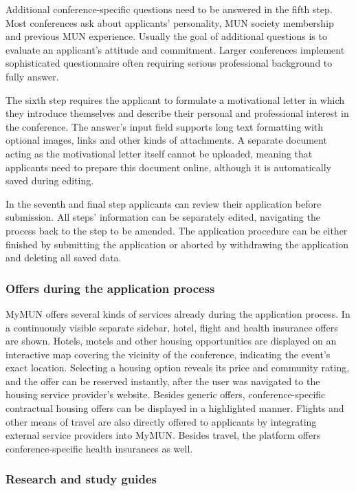 Additional conference-specific questions need to be answered in the fifth step. Most conferences ask about applicants' personality, MUN society membership and previous MUN experience. Usually the goal of additional questions is to evaluate an applicant's attitude and commitment. Larger conferences implement sophisticated questionnaire often requiring serious professional background to fully answer.

The sixth step requires the applicant to formulate a motivational letter in which they introduce themselves and describe their personal and professional interest in the conference. The answer's input field supports long text formatting with optional images, links and other kinds of attachments. A separate document acting as the motivational letter itself cannot be uploaded, meaning that applicants need to prepare this document online, although it is automatically saved during editing.

In the seventh and final step applicants can review their application before submission. All steps' information can be separately edited, navigating the process back to the step to be amended. The application procedure can be either finished by submitting the application or aborted by withdrawing the application and deleting all saved data.

\subsubsection{Offers during the application process}

MyMUN offers several kinds of services already during the application process. In a continuously visible separate sidebar, hotel, flight and health insurance offers are shown. Hotels, motels and other housing opportunities are displayed on an interactive map covering the vicinity of the conference, indicating the event's exact location. Selecting a housing option reveals its price and community rating, and the offer can be reserved instantly, after the user was navigated to the housing service provider's website. Besides generic offers, conference-specific contractual housing offers can be displayed in a highlighted manner. Flights and other means of travel are also directly offered to applicants by integrating external service providers into MyMUN. Besides travel, the platform offers conference-specific health insurances as well.

\subsubsection{Research and study guides}

